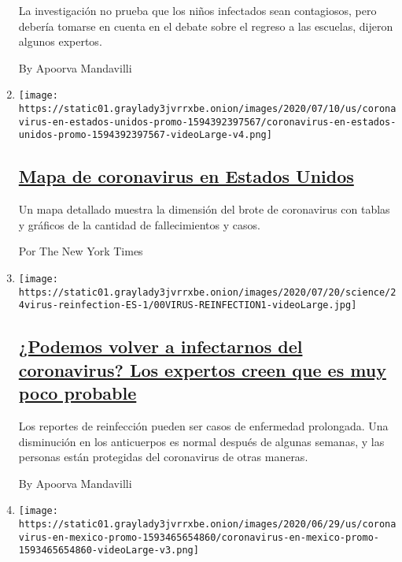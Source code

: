 \begin{enumerate}
  La investigación no prueba que los niños infectados sean contagiosos,
  pero debería tomarse en cuenta en el debate sobre el regreso a las
  escuelas, dijeron algunos expertos.

  By Apoorva Mandavilli
\item
  \texttt{[image: https://static01.graylady3jvrrxbe.onion/images/2020/07/10/us/coronavirus-en-estados-unidos-promo-1594392397567/coronavirus-en-estados-unidos-promo-1594392397567-videoLarge-v4.png]}

  \hypertarget{mapa-de-coronavirus-en-estados-unidos}{%
  \subsection{\texorpdfstring{\href{/es/interactive/2020/espanol/mundo/coronavirus-en-estados-unidos.html}{Mapa
  de coronavirus en Estados
  Unidos}}{Mapa de coronavirus en Estados Unidos}}\label{mapa-de-coronavirus-en-estados-unidos}}

  Un mapa detallado muestra la dimensión del brote de coronavirus con
  tablas y gráficos de la cantidad de fallecimientos y casos.

  Por The New York Times
\item
  \texttt{[image: https://static01.graylady3jvrrxbe.onion/images/2020/07/20/science/24virus-reinfection-ES-1/00VIRUS-REINFECTION1-videoLarge.jpg]}

  \hypertarget{podemos-volver-a-infectarnos-del-coronavirus-los-expertos-creen-que-es-muy-poco-probable}{%
  \subsection{\texorpdfstring{\href{/es/2020/07/24/espanol/ciencia-y-tecnologia/reinfeccion-coronavirus.html}{¿Podemos
  volver a infectarnos del coronavirus? Los expertos creen que es muy
  poco
  probable}}{¿Podemos volver a infectarnos del coronavirus? Los expertos creen que es muy poco probable}}\label{podemos-volver-a-infectarnos-del-coronavirus-los-expertos-creen-que-es-muy-poco-probable}}

  Los reportes de reinfección pueden ser casos de enfermedad prolongada.
  Una disminución en los anticuerpos es normal después de algunas
  semanas, y las personas están protegidas del coronavirus de otras
  maneras.

  By Apoorva Mandavilli
\item
  \texttt{[image: https://static01.graylady3jvrrxbe.onion/images/2020/06/29/us/coronavirus-en-mexico-promo-1593465654860/coronavirus-en-mexico-promo-1593465654860-videoLarge-v3.png]}


\end{enumerate}
